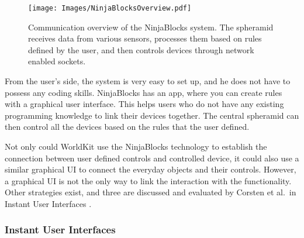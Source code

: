 \begin{figure}[!t]
	\centering
	\texttt{[image: Images/NinjaBlocksOverview.pdf]}
	\caption{Communication overview of the NinjaBlocks system. The spheramid receives data from various sensors, processes them based on rules defined by the user, and then controls devices through network enabled sockets.}
	\label{fig:NinjaBlocksOverview}
\end{figure}

From the user's side, the system is very easy to set up, and he does not have to possess any coding skills.
NinjaBlocks has an app, where you can create rules with a graphical user interface.
This helps users who do not have any existing programming knowledge to link their devices together.
The central spheramid can then control all the devices based on the rules that the user defined.

Not only could WorldKit use the NinjaBlocks technology to establish the connection between user defined controls and controlled device, it could also use a similar graphical UI to connect the everyday objects and their controls.
However, a graphical UI is not the only way to link the interaction with the functionality.
Other strategies exist, and three are discussed and evaluated by Corsten et al.\ in Instant User Interfaces \cite{corsten13}. 

\subsubsection{Instant User Interfaces}
\label{sec:InstantUserInterfaces}

